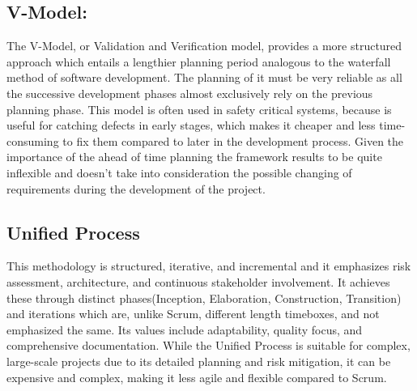 \subsection{V-Model:}
The V-Model, or Validation and Verification model, provides a more structured approach which entails a lengthier planning period analogous to the waterfall method of software development. The planning of it must be very reliable as all the successive development phases almost exclusively rely on the previous planning phase. This model is often used in safety critical systems, because is useful for catching defects in early stages, which makes it cheaper and less time-consuming to fix them compared to later in the development process. Given the importance of the ahead of time planning the framework results to be quite inflexible and doesn't take into consideration the possible changing of requirements during the development of the project.

\subsection{Unified Process}
This methodology is structured, iterative, and incremental and it emphasizes risk assessment, architecture, and continuous stakeholder involvement. It achieves these through distinct phases(Inception, Elaboration, Construction, Transition) and iterations which are, unlike Scrum, different length timeboxes, and not emphasized the same. Its values include adaptability, quality focus, and comprehensive documentation. While the Unified Process is suitable for complex, large-scale projects due to its detailed planning and risk mitigation, it can be expensive and complex, making it less agile and flexible compared to Scrum.

